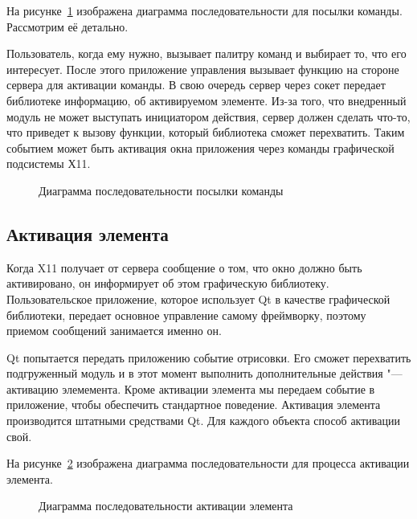 На рисунке~\ref{fig:send-command} изображена диаграмма последовательности для
посылки команды. Рассмотрим её детально.

Пользователь, когда ему нужно, вызывает палитру команд и выбирает то, что
его интересует. После этого приложение управления вызывает функцию на стороне
сервера для активации команды. В свою очередь сервер через сокет передает 
библиотеке информацию, об активируемом элементе.
Из-за того, что внедренный модуль не может выступать инициатором действия, 
сервер должен сделать что-то, что приведет к вызову функции, который
библиотека сможет перехватить. Таким событием может быть активация 
окна приложения через команды графической подсистемы Х11.

\begin{figure}[h]
	\centering
	
	\caption{Диаграмма последовательности посылки
		команды}\label{fig:send-command}
\end{figure}

\subsection{Активация элемента}

Когда X11 получает от сервера сообщение о том, что окно должно быть
активировано, он информирует об этом графическую библиотеку. Пользовательское
приложение, которое использует Qt в качестве графической библиотеки,
передает основное управление самому фреймворку, поэтому приемом сообщений
занимается именно он.

Qt попытается передать приложению событие отрисовки. Его сможет перехватить
подгруженный модуль и в этот момент выполнить дополнительные действия "---
активацию элемемента. Кроме активации элемента мы передаем событие в
приложение, чтобы обеспечить стандартное поведение. Активация элемента
производится штатными средствами Qt. Для каждого объекта способ активации
свой.

На рисунке~\ref{fig:activate-elem} изображена диаграмма последовательности для
процесса активации элемента.

\begin{figure}[h]
	\centering
	
	\caption{Диаграмма последовательности активации
		элемента}\label{fig:activate-elem}
\end{figure}

